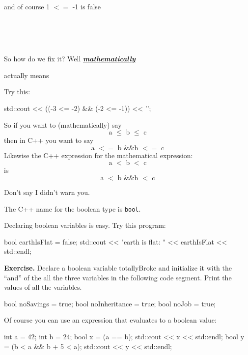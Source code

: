 {{{{{{\\
\\
\\

and of course 1 $<=$ -1 is false

\\
\\
\\

So how do we fix it? Well \underline{\textit{\textbf{mathematically}}}


actually means


Try this:
\begin{console}
std::cout << ((-3 <= -2) && (-2 <= -1)) << '\n';
\end{console}

So if you want to (mathematically) say
\[
\text{a $\leq$ b $\leq$ c}
\]
then in C++ you want to say
\[
\text{a $<=$ b \&\& b $<=$ c}
\]
Likewise the C++ expression for the mathematical expression:
\[
\text{a $<$ b $<$ c}
\]
is
\[
\text{a $<$ b \&\& b $<$ c}
\]

Don't say I didn't warn you.



The C++ name for the boolean type is \verb!bool!.

Declaring boolean variables is easy. Try this program:
\begin{console}
bool earthIsFlat = false;
std::cout << "earth is flat: " << earthIsFlat
          << std::endl;
\end{console}

\textbf{Exercise.} Declare a boolean variable totallyBroke and initialize it
with the “and” of the all the three variables in the following code segment.
Print the values of all the variables.

\begin{console}
bool noSavings = true;
bool noInheritance = true;
bool noJob = true;


\end{console}

Of course you can use an expression that evaluates to a boolean value:
\begin{console}
int a = 42;
int b = 24;
bool x = (a == b);
std::cout << x << std::endl;
bool y = (b < a && b + 5 < a);
std::cout << y << std::endl;
\end{console}

}}}}}}
